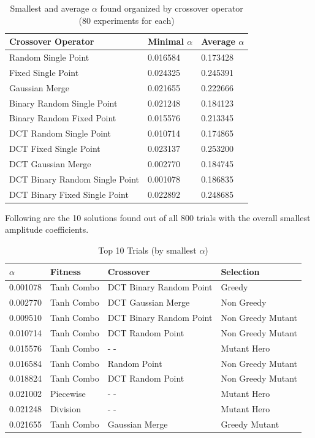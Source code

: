 \documentclass[12pt]{article}
\begin{document}
\begin{table}[ht]
\centering
\caption{Smallest and average $\alpha$ found organized by crossover operator (80 experiments for each)}
\begin{tabular}{|p{5cm}|p{2cm}|p{2cm}|}
\hline
Crossover Operator & Minimal $\alpha$ & Average $\alpha$ \\
\hline
\hline
Random Single Point & 0.016584 & 0.173428 \\
\hline
Fixed Single Point & 0.024325 & 0.245391 \\
\hline
Gaussian Merge & 0.021655 & 0.222666 \\
\hline
Binary Random Single Point & 0.021248 & 0.184123 \\
\hline
Binary Random Fixed Point & 0.015576  & 0.213345 \\
\hline
DCT Random Single Point & 0.010714 & 0.174865 \\
\hline
DCT Fixed Single Point & 0.023137  & 0.253200 \\
\hline
DCT Gaussian Merge & 0.002770 & 0.184745 \\
\hline
DCT Binary Random Single Point & 0.001078 & 0.186835 \\
\hline
DCT Binary Fixed Single Point & 0.022892 & 0.248685 \\
\hline
\end{tabular}
\end{table}

\clearpage

Following are the 10 solutions found out of all 800 trials with the
overall smallest amplitude coefficients.

\begin{table}[ht]
\centering
\caption[small]{Top 10 Trials (by smallest $\alpha$)}
\begin{tabular}{|p{1.5cm}|p{3cm}|p{3cm}|p{3cm}|}
\hline
$\alpha$ & Fitness & Crossover & Selection \\
\hline
\hline
0.001078 & Tanh Combo & DCT Binary Random Point & Greedy \\
\hline
0.002770 & Tanh Combo & DCT Gaussian Merge & Non Greedy \\
\hline
0.009510 & Tanh Combo & DCT Binary Random Point & Non Greedy Mutant \\
\hline
0.010714 & Tanh Combo & DCT Random Point & Non Greedy Mutant \\
\hline
0.015576 & Tanh Combo & - - & Mutant Hero \\
\hline
0.016584 & Tanh Combo & Random Point & Non Greedy Mutant \\
\hline
0.018824 & Tanh Combo & DCT Random Point & Non Greedy Mutant \\
\hline
0.021002 & Piecewise &  - - & Mutant Hero \\
\hline
0.021248 & Division &  - - & Mutant Hero \\
\hline
0.021655 & Tanh Combo & Gaussian Merge & Greedy Mutant \\
\hline
\end{tabular}
\end{table}
\end{document}
